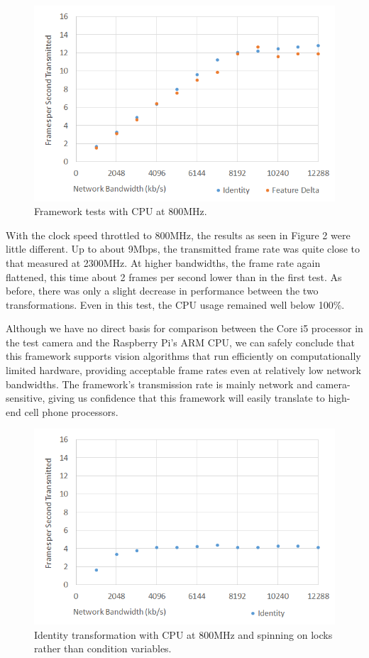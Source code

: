 \begin{figure}
\includegraphics[width=\columnwidth]{figure4.png}
\caption{Framework tests with CPU at 800MHz.}
\end{figure}

With the clock speed throttled to 800MHz, the results as seen in Figure 2 were little different.  Up to about
9Mbps, the transmitted frame rate was quite close to that measured at 2300MHz.  At
higher bandwidths, the frame rate again flattened, this time about 2 frames per second
lower than in the first test.  As before, there was only a slight decrease in performance
between the two transformations.  Even in this test, the CPU usage remained well
below 100\%.

Although we have no direct basis for comparison between the Core i5 processor in the
test camera and the Raspberry Pi's ARM CPU, we can safely conclude that this framework
supports vision algorithms that run efficiently on computationally limited hardware, providing
acceptable frame rates even at relatively low network bandwidths.  The framework's transmission rate
is mainly network and camera-sensitive, giving us confidence that
this framework  will easily translate to high-end cell phone processors.

\begin{figure}
\includegraphics[width=\columnwidth]{figure5.png}
\caption{Identity transformation with CPU at 800MHz and spinning on locks rather than condition variables.}
\end{figure}

